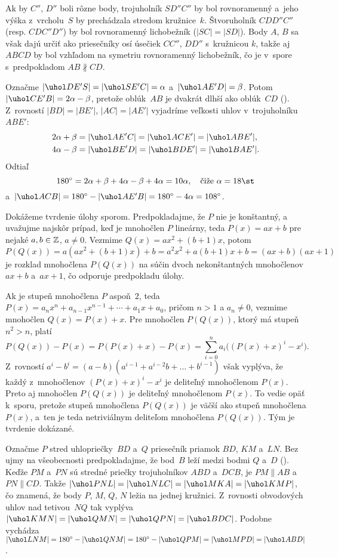 {Ak by $C''$, $D''$ boli rôzne body, trojuholník $SD''C''$ by bol rovnoramenný a~jeho výška z~vrcholu~$S$ by prechádzala stredom kružnice~$k$. Štvoruholník $CDD''C''$ (resp. $CDC''D''$) by bol rovnoramenný lichobežník ($|SC|=|SD|$). Body $A$, $B$ sa však dajú určiť ako priesečníky osí úsečiek $CC''$, $DD''$ s~kružnicou $k$, takže aj $ABCD$ by bol vzhľadom na symetriu rovnoramenný lichobežník, čo je v~spore s~predpokladom $AB\nparallel CD$.
%

Označme $|\uhol DE'S|=|\uhol SE'C|=\alpha$ a~$|\uhol AE'D|=\beta$.
Potom $|\uhol CE'B|=2\alpha-\beta$, pretože oblúk~$AB$ je dvakrát dlhší ako oblúk~$CD$ (\obr).
Z~rovností $|BD|=|BE'|$, $|AC|=|AE'|$ vyjadríme veľkosti uhlov v~trojuholníku $ABE'$:
$$
\aligned
2\alpha+\beta&=|\uhol AE'C|=|\uhol ACE'|=|\uhol ABE'|,\\
4\alpha-\beta&=|\uhol BE'D|=|\uhol BDE'|=|\uhol BAE'|.
\endaligned
$$
Odtiaľ
$$
180^\circ= 2\alpha+\beta + 4\alpha-\beta + 4\alpha=10\alpha, \quad\text{čiže $\alpha=18\st$}
$$
a~$|\uhol ACB|=180^\circ-|\uhol AE'B|=180^\circ-4\alpha=108^\circ$.
}

{%
Dokážeme tvrdenie úlohy sporom.
Predpokladajme, že $P$ nie je konštantný, a uvažujme najskôr prípad, keď je
mnohočlen $P$ lineárny, teda $P(x)=ax+b$ pre nejaké
$a, b \in \Bbb Z$, $a \ne 0$. Vezmime $Q(x)=ax^2+(b+1)x$, potom
$$
P(Q(x))=a(ax^2+(b+1)x)+b=a^2x^2+a(b+1)x+b=(ax+b)(ax+1)
$$
je rozklad mnohočlena $P(Q(x))$ na súčin dvoch nekonštantných mnohočlenov
$ax+b$ a~$ax+1$, čo odporuje predpokladu úlohy.

Ak je stupeň mnohočlena $P$ aspoň~$2$, teda $P(x) = a_nx^{n} +
a_{n-1}x^{n-1}+\cdots+a_1x+a_0$, pričom $n>1$ a $a_n\ne 0$, vezmime mnohočlen
$Q(x)=P(x)+x$. Pre mnohočlen $P(Q(x))$, ktorý má stupeň $n^2>n$, platí
$$
P(Q(x))-P(x)=P(P(x)+x)-P(x)=\sum_{i=0}^{n} a_i\bigl((P(x)+x)^{i}-x^{i}\bigr).
$$
Z~rovností $a^i-b^i=(a-b)(a^{i-1}+a^{i-2}b+\ldots+b^{i-1})$ však vyplýva,
že každý z~mnohočlenov $(P(x)+x)^{i}-x^{i}$ je deliteľný mnohočlenom
$P(x)$. Preto aj mnohočlen $P(Q(x))$ je deliteľný mnohočlenom $P(x)$. To vedie opäť
k~sporu, pretože stupeň mnohočlena $P(Q(x))$ je väčší
ako stupeň mnohočlena $P(x)$, a~ten je teda netriviálnym deliteľom
mnohočlena $P(Q(x))$. Tým je tvrdenie dokázané.}

{%
Označme $P$ stred uhlopriečky~$BD$ a~$Q$ priesečník priamok $BD$,
$KM$ a~$LN$. Bez ujmy na všeobecnosti predpokladajme, že bod~$B$ leží medzi
bodmi $Q$ a~$D$ (\obr). Keďže $PM$ a~$PN$ sú stredné priečky trojuholníkov
$ABD$ a~$DCB$, je $PM\parallel AB$ a~${PN\parallel CD}$.
Takže $|\uhol PNL|=|\uhol NLC|=|\uhol MKA|=|\uhol KMP|$, čo znamená, že body
$P$, $M$, $Q$, $N$ ležia na jednej kružnici.
%
Z~rovnosti obvodových uhlov nad tetivou~$NQ$
tak vyplýva $|\uhol KMN|=|\uhol QMN|=|\uhol QPN|=|\uhol BDC|$. Podobne vychádza
$|\uhol LNM|=180^{\circ}-|\uhol QNM|=180^{\circ}-|\uhol QPM|=|\uhol MPD|=|\uhol ABD|$.
}

